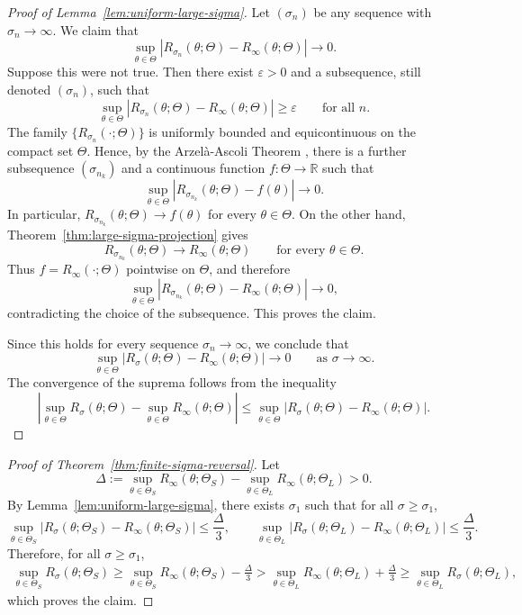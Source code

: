 \documentclass[11pt]{article}
\theoremstyle{plain}
\theoremstyle{definition}
\begin{document}
\begin{proof}[Proof of Lemma~\ref{lem:uniform-large-sigma}]
Let $(\sigma_n)$ be any sequence with $\sigma_n\to\infty$. We claim that
\[
\sup_{\theta\in\Theta}
|R_{\sigma_n}(\theta;\Theta)-R_\infty(\theta;\Theta)|
\to 0.
\]
Suppose this were not true. Then there exist $\varepsilon>0$ and a subsequence,
still denoted $(\sigma_n)$, such that
\[
\sup_{\theta\in\Theta}
|R_{\sigma_n}(\theta;\Theta)-R_\infty(\theta;\Theta)|
\ge \varepsilon
\qquad\text{for all }n.
\]
The family $\{R_{\sigma_n}(\cdot;\Theta)\}$ is uniformly bounded and
equicontinuous on the compact set $\Theta$. Hence, by the
Arzel\`a-Ascoli Theorem \cite[Theorem~2.4.7]{Dudley_2002}, there is a
further subsequence $(\sigma_{n_k})$ and a continuous function
$f:\Theta\to\mathbb R$ such that
\[
\sup_{\theta\in\Theta}
|R_{\sigma_{n_k}}(\theta;\Theta)-f(\theta)|
\to 0.
\]
In particular, $R_{\sigma_{n_k}}(\theta;\Theta)\to f(\theta)$ for every
$\theta\in\Theta$. On the other hand, Theorem~\ref{thm:large-sigma-projection}
gives
\[
R_{\sigma_{n_k}}(\theta;\Theta)\to R_\infty(\theta;\Theta)
\qquad\text{for every }\theta\in\Theta.
\]
Thus $f=R_\infty(\cdot;\Theta)$ pointwise on $\Theta$, and therefore
\[
\sup_{\theta\in\Theta}
|R_{\sigma_{n_k}}(\theta;\Theta)-R_\infty(\theta;\Theta)|
\to 0,
\]
contradicting the choice of the subsequence. This proves the claim.

Since this holds for every sequence $\sigma_n\to\infty$, we conclude that
\[
\sup_{\theta\in\Theta}
|R_{\sigma}(\theta;\Theta)-R_\infty(\theta; \Theta)|
\to 0
\qquad\text{as }\sigma\to\infty.
\]
The convergence of the suprema follows from the inequality
\[
|
\sup_{\theta\in\Theta}R_\sigma(\theta; \Theta)
-\sup_{\theta\in\Theta}R_\infty(\theta; \Theta)
|
\le
\sup_{\theta\in\Theta}
|R_\sigma(\theta; \Theta)-R_\infty(\theta; \Theta)|.
\]
\end{proof}

\begin{proof}[Proof of Theorem~\ref{thm:finite-sigma-reversal}]
Let 
\[
\Delta
:=
\sup_{\theta\in\Theta_S} R_\infty(\theta; \Theta_S)
-
\sup_{\theta\in\Theta_L} R_\infty(\theta; \Theta_L)
>0.
\]
By Lemma~\ref{lem:uniform-large-sigma}, there exists $\sigma_1$ such that for all
$\sigma \ge \sigma_1$,
\[
\sup_{\theta\in\Theta_S}
|R_\sigma(\theta;\Theta_S)-R_\infty(\theta; \Theta_S)|
\le \frac{\Delta}{3},
\qquad
\sup_{\theta\in\Theta_L}
|R_\sigma(\theta;\Theta_L)-R_\infty(\theta; \Theta_L)|
\le \frac{\Delta}{3}.
\]
Therefore, for all 
$\sigma \ge \sigma_1$,
\begin{align*}
\sup_{\theta\in\Theta_S}R_\sigma(\theta;\Theta_S)
\ge
\sup_{\theta\in\Theta_S}R_\infty(\theta; \Theta_S)-\frac{\Delta}{3} 
>
\sup_{\theta\in\Theta_L}R_\infty(\theta; \Theta_L)+\frac{\Delta}{3} 
\ge
\sup_{\theta\in\Theta_L}R_\sigma(\theta;\Theta_L),
\end{align*}
which proves the claim.
\end{proof}
\end{document}
